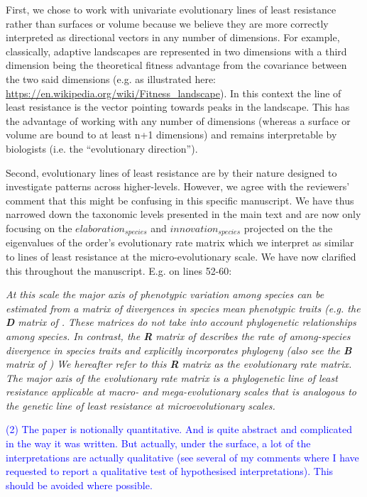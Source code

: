 \documentclass[12pt,letterpaper]{article}
\begin{document}
{First, we chose to work with univariate evolutionary lines of least resistance rather than surfaces or volume because we believe they are more correctly interpreted as directional vectors in any number of dimensions. For example, classically, adaptive landscapes are represented in two dimensions with a third dimension being the theoretical fitness advantage from the covariance between the two said dimensions (e.g. as illustrated here: \url{https://en.wikipedia.org/wiki/Fitness_landscape}). In this context the line of least resistance is the vector pointing towards peaks in the landscape. This has the advantage of working with any number of dimensions (whereas a surface or volume are bound to at least n+1 dimensions) and remains interpretable by biologists (i.e. the ``evolutionary direction'').

Second, evolutionary lines of least resistance are by their nature designed to investigate patterns across higher-levels. However, we agree with the reviewers’ comment that this might be confusing in this specific manuscript. We have thus narrowed down the taxonomic levels presented in the main text and are now only focusing on the $elaboration_{species}$ and $innovation_{species}$ projected on the the eigenvalues of the order’s evolutionary rate matrix which we interpret as similar to lines of least resistance at the micro-evolutionary scale. We have now clarified this throughout the manuscript. E.g. on lines 52-60:

\noindent\textit{At this scale the major axis of phenotypic variation among species \cite{marroig2005size, fasanelli2022allometry} can be estimated from a matrix of divergences in species mean phenotypic traits (e.g. the \textbf{D} matrix of \cite{BlowsHiggie2003, mcglothlin2018adaptive}.
These matrices do not take into account phylogenetic relationships among species.
In contrast, the \textbf{R} matrix of \cite{Houle2017} describes the rate of among-species divergence in species traits and explicitly incorporates phylogeny (also see the \textbf{B} matrix of \cite{Machado2020}) %
We hereafter refer to this \textbf{R} matrix as the \textit{evolutionary rate matrix}. %
The major axis of the evolutionary rate matrix is a phylogenetic line of least resistance applicable at macro- and mega-evolutionary scales that is analogous to the genetic line of least resistance at microevolutionary scales. }

\textcolor{blue}{(2) The paper is notionally quantitative. And is quite abstract and complicated in the way it was written. But actually, under the surface, a lot of the interpretations are actually qualitative (see several of my comments where I have requested to report a qualitative test of hypothesised interpretations). This should be avoided where possible.}

}
\end{document}
